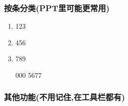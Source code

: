 \documentclass{article}
\begin{document}
\subsubsection{按条分类(PPT里可能更常用)}

\begin{enumerate}
    \item 123
    \item 456
    \item 789
    \item[000] 5677  %
\end{enumerate}

\subsubsection{其他功能(不用记住,在工具栏都有)}
\end{document}
